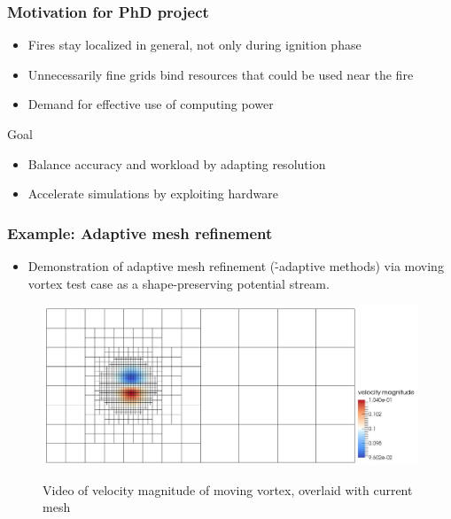 \begin{frame}
\frametitle{Motivation for PhD project}

\begin{itemize}
\item Fires stay localized in general, not only during ignition phase
\item Unnecessarily fine grids bind resources that could be used near the fire
\item Demand for effective use of computing power
\end{itemize}

\vfill{}

\begin{block}{Goal}
\begin{itemize}
\item Balance accuracy and workload by adapting resolution
\item Accelerate simulations by exploiting hardware
\end{itemize}
\end{block}

\begin{center}
\end{center}
\end{frame}





\begin{frame}
\frametitle{Example: Adaptive mesh refinement}

\begin{itemize}
\item Demonstration of adaptive mesh refinement (\h-adaptive methods) via moving vortex test case as a shape-preserving potential stream.
\end{itemize}

\begin{figure}
\centering
\href{run:movies/amrvortex_1pass.avi?loop&poster}{\includegraphics[width=\textwidth]{movies/amrvortex_1pass_teaser.png}}
\caption{Video of velocity magnitude of moving vortex, overlaid with current mesh}
\end{figure}
\end{frame}





